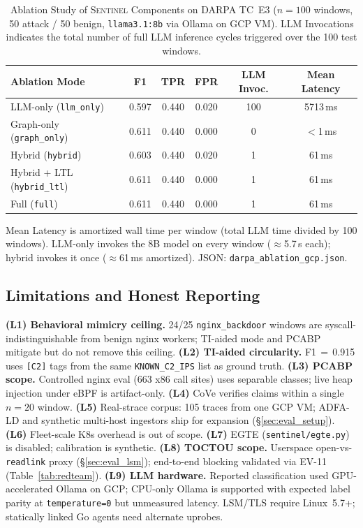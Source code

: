 \documentclass[journal]{IEEEtran}
\newcommand{\sentinel}{\textsc{Sentinel}}
\begin{document}
\begin{table}[!t]
\caption{Ablation Study of \sentinel{} Components on DARPA TC~E3 ($n{=}100$ windows, 50 attack / 50 benign, \texttt{llama3.1:8b} via Ollama on GCP VM). LLM Invocations indicates the total number of full LLM inference cycles triggered over the 100 test windows.}
\label{tab:ablation}
\centering
\footnotesize
\renewcommand{\arraystretch}{1.1}
\begin{tabular}{@{}lccccc@{}}
\toprule
\textbf{Ablation Mode} & \textbf{F1} & \textbf{TPR} & \textbf{FPR} & \textbf{LLM Invoc.} & \textbf{Mean Latency} \\
\midrule
LLM-only (\texttt{llm\_only})   & 0.597 & 0.440 & 0.020 & 100 & 5713\,ms \\
Graph-only (\texttt{graph\_only}) & 0.611 & 0.440 & 0.000 & 0   & $<$1\,ms \\
Hybrid (\texttt{hybrid})         & 0.603 & 0.440 & 0.020 & 1   & 61\,ms \\
Hybrid + LTL (\texttt{hybrid\_ltl}) & 0.611 & 0.440 & 0.000 & 1   & 61\,ms \\
Full (\texttt{full})             & 0.611 & 0.440 & 0.000 & 1   & 61\,ms \\
\bottomrule
\end{tabular}
\vspace{2pt}
{\scriptsize Mean Latency is amortized wall time per window (total LLM time
divided by 100 windows). LLM-only invokes the 8B model on every window
($\approx$5.7\,s each); hybrid invokes it once ($\approx$61\,ms amortized).
JSON: \texttt{darpa\_ablation\_gcp.json}.}
\end{table}

\subsection{Limitations and Honest Reporting}\label{sec:limits}

\noindent\textbf{(L1) Behavioral mimicry ceiling.} 24/25 \texttt{nginx\_backdoor}
windows are syscall-indistinguishable from benign nginx workers; TI-aided mode
and PCABP mitigate but do not remove this ceiling.
\textbf{(L2) TI-aided circularity.} F1\,$=$\,0.915 uses \texttt{[C2]} tags from
the same \texttt{KNOWN\_C2\_IPS} list as ground truth.
\textbf{(L3) PCABP scope.} Controlled nginx eval (663 x86 call sites) uses
separable classes; live heap injection under eBPF is artifact-only.
\textbf{(L4)} CoVe verifies claims within a single $n{=}20$ window.
\textbf{(L5)} Real-strace corpus: 105 traces from one GCP VM; ADFA-LD and
synthetic multi-host ingestors ship for expansion (\S\ref{sec:eval_setup}).
\textbf{(L6)} Fleet-scale K8s overhead is out of scope.
\textbf{(L7)} EGTE (\texttt{sentinel/egte.py}) is disabled; calibration is synthetic.
\textbf{(L8) TOCTOU scope.} Userspace open-vs-\texttt{readlink} proxy
(\S\ref{sec:eval_lsm}); end-to-end blocking validated via EV-11
(Table~\ref{tab:redteam}).
\textbf{(L9) LLM hardware.} Reported classification used GPU-accelerated
Ollama on GCP; CPU-only Ollama is supported with expected label parity at
\texttt{temperature=0} but unmeasured latency.
LSM/TLS require Linux~5.7+; statically linked Go agents need alternate uprobes.
\end{document}
